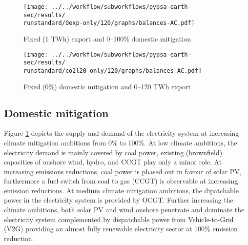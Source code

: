\begin{figure*}[h!]
    \centering
    \begin{subfigure}[b]{0.49\linewidth}
        \centering
        \texttt{[image: ../../workflow/subworkflows/pypsa-earth-sec/results/\\runstandard/0exp-only/120/graphs/balances-AC.pdf]}
        \caption{Fixed (1 TWh) export and 0--100\% domestic mitigation}
        \label{fig:balances-ac-0exp}
    \end{subfigure}
    \hfill
    \begin{subfigure}[b]{0.49\linewidth}
        \centering
        \texttt{[image: ../../workflow/subworkflows/pypsa-earth-sec/results/\\runstandard/co2l20-only/120/graphs/balances-AC.pdf]}
        \caption{Fixed (0\%) domestic mitigation and 0--120 TWh export}
        \label{fig:balances-ac-co2l20-120}
    \end{subfigure}
    \hfill
    \caption{Electricity supply and demand at fixed export levels and increasing domestic mitigation export (\ref{fig:balances-ac-0exp}) and vice versa (\ref{fig:balances-ac-co2l20-120}). Increasing domestic mitigation first phases out carbon-intensive coal generation in favor of CCGT, at medium to high mitigation the electricity system is fully renewable supported by flexibility through V2G and sector coupling. Increasing electricity demands cover EVs and hydrogen generation for other sectors.
    At increasing hydrogen exports the additional electricity required for hydrogen electrolysis is covered by onshore wind and solar PV, as imposed by the hydrogen regulation. 
    }
    \label{fig:balances-ac}
\end{figure*}


\subsection{Domestic mitigation}
\label{subsec:increase_limit}

Figure \ref{fig:balances-ac-0exp} depicts the supply and demand of the electricity system at increasing climate mitigation ambitions from 0\% to 100\%. At low climate ambitions, the electricity demand is mainly covered by coal power, existing (brownfield) capacities of onshore wind, hydro, and CCGT play only a minor role. 
At increasing emissions reductions, coal power is phased out in favour of solar PV, furthermore a fuel switch from coal to gas (CCGT) is observable at increasing emission reductions. At medium climate mitigation ambitions, the dipatchable power in the electricity system is provided by OCGT. 
Further increasing the climate ambitions, both solar PV and wind onshore penetrate and dominate the electricity system complemented by dispatchable power from Vehicle-to-Grid (V2G) providing an almost fully renewable electricity sector at 100\% emission reduction. 

